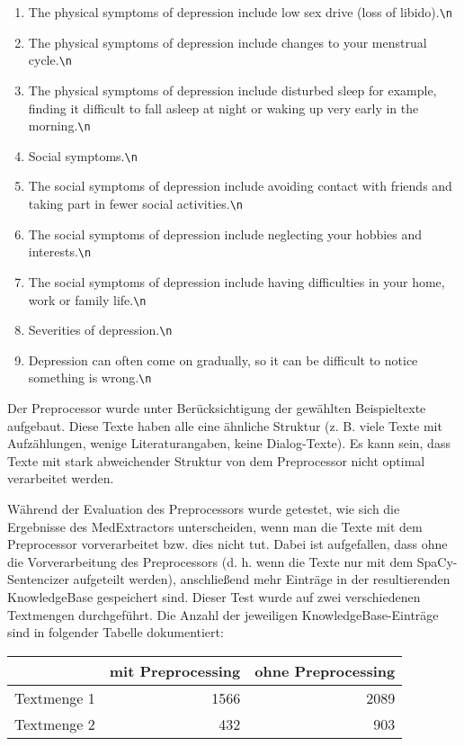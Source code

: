 \begin{enumerate}
	\item \glqq The physical symptoms of depression include low sex drive (loss of libido).\verb!\n!\grqq
	\item \glqq The physical symptoms of depression include changes to your menstrual cycle.\verb!\n!\grqq
	\item \glqq The physical symptoms of depression include disturbed sleep for example, finding it difficult to fall asleep at night or waking up very early in the morning.\verb!\n!\grqq
	\item \glqq Social symptoms.\verb!\n!\grqq
	\item \glqq The social symptoms of depression include avoiding contact with friends and taking part in fewer social activities.\verb!\n!\grqq
	\item \glqq The social symptoms of depression include neglecting your hobbies and interests.\verb!\n!\grqq
	\item \glqq The social symptoms of depression include having difficulties in your home, work or family life.\verb!\n!\grqq
	\item \glqq Severities of depression.\verb!\n!\grqq
	\item \glqq Depression can often come on gradually, so it can be difficult to notice something is wrong.\verb!\n!\grqq 
\end{enumerate}

Der Preprocessor wurde unter Berücksichtigung der gewählten Beispieltexte aufgebaut. Diese Texte haben alle eine ähnliche Struktur (z. B. viele Texte mit Aufzählungen, wenige Literaturangaben, keine Dialog-Texte). Es kann sein, dass Texte mit stark abweichender Struktur von dem Preprocessor nicht optimal verarbeitet werden.

Während der Evaluation des Preprocessors wurde getestet, wie sich die Ergebnisse des MedExtractors unterscheiden, wenn man die Texte mit dem Preprocessor vorverarbeitet bzw. dies nicht tut. 
Dabei ist aufgefallen, dass ohne die Vorverarbeitung des Preprocessors (d. h. wenn die Texte nur mit dem SpaCy-Sentencizer aufgeteilt werden), anschließend mehr Einträge in der resultierenden KnowledgeBase gespeichert sind. Dieser Test wurde auf zwei verschiedenen Textmengen durchgeführt. Die Anzahl der jeweiligen KnowledgeBase-Einträge sind in folgender Tabelle dokumentiert:

\begin{tabular}[h]{lrr}
	\hline
	 & mit Preprocessing & ohne Preprocessing\\
	 \hline
	Textmenge 1 & 1566 & 2089 \\
	Textmenge 2 & 432 & 903\\
	\hline
\end{tabular}\\

